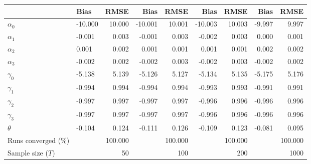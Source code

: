 
\begin{tabular}[t]{llrrrrrrr}
\toprule
  & Bias & RMSE & Bias & RMSE & Bias & RMSE & Bias & RMSE\\
\midrule
$\alpha_{0}$ & -10.000 & 10.000 & -10.001 & 10.001 & -10.003 & 10.003 & -9.997 & 9.997\\
$\alpha_{1}$ & -0.001 & 0.003 & -0.001 & 0.003 & -0.002 & 0.003 & 0.000 & 0.001\\
$\alpha_{2}$ & 0.001 & 0.002 & 0.001 & 0.001 & 0.001 & 0.001 & 0.002 & 0.002\\
$\alpha_{3}$ & -0.002 & 0.002 & -0.002 & 0.003 & -0.002 & 0.003 & -0.002 & 0.002\\
$\gamma_{0}$ & -5.138 & 5.139 & -5.126 & 5.127 & -5.134 & 5.135 & -5.175 & 5.176\\
$\gamma_{1}$ & -0.994 & 0.994 & -0.994 & 0.994 & -0.993 & 0.993 & -0.991 & 0.991\\
$\gamma_{2}$ & -0.997 & 0.997 & -0.997 & 0.997 & -0.996 & 0.996 & -0.996 & 0.996\\
$\gamma_{3}$ & -0.997 & 0.997 & -0.997 & 0.997 & -0.996 & 0.996 & -0.996 & 0.996\\
$\theta$ & -0.104 & 0.124 & -0.111 & 0.126 & -0.109 & 0.123 & -0.081 & 0.095\\
Runs converged (\%) &  & 100.000 &  & 100.000 &  & 100.000 &  & 100.000\\
Sample size ($T$) &  & 50 &  & 100 &  & 200 &  & 1000\\
\bottomrule
\end{tabular}
